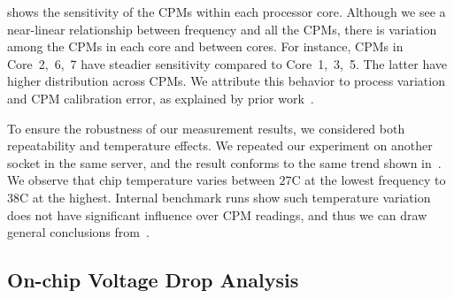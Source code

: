  shows the sensitivity of the CPMs within each processor core. Although we see a near-linear relationship between frequency and all the CPMs, there is variation among the CPMs in each core and between cores. For instance, CPMs in Core~2,~6,~7 have steadier sensitivity compared to Core~1,~3,~5. The latter have higher distribution across CPMs. We attribute this behavior to process variation and CPM calibration error, as explained by prior work~\cite{floyd2013runtime}.

To ensure the robustness of our measurement results, we considered both repeatability and temperature effects. We repeated our experiment on another socket in the same server, and the result conforms to the same trend shown in~. We observe that chip temperature varies between $27$\textdegree C at the lowest frequency to $38$\textdegree C at the highest. Internal benchmark runs show such temperature variation does not have significant influence over CPM readings, and thus we can draw general conclusions from~.

\subsection{On-chip Voltage Drop Analysis}
\label{sec:voltage:rootcause:vdrop-analysis}


